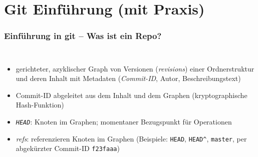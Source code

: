 \documentclass{beamer}
\begin{document}
\section{Git Einführung (mit Praxis)}
\begin{frame}
\frametitle{Einführung in git – Was ist ein Repo?}
\begin{columns}
  \begin{itemize}
  \item gerichteter, azyklischer Graph von Versionen
    (\emph{revisions}) einer Ordnerstruktur und deren Inhalt mit
    Metadaten (\emph{Commit-ID}, Autor, Beschreibungstext)
  \item Commit-ID abgeleitet aus dem Inhalt und dem Graphen
    (kryptographische Hash-Funktion)
  \item \emph{\texttt{HEAD}}: Knoten im Graphen; momentaner
    Bezugspunkt für Operationen
  \item \emph{refs}: referenzieren Knoten im Graphen (Beispiele:
    \texttt{HEAD}, \texttt{HEAD\^}, \texttt{master}, per abgekürzter
    Commit-ID \texttt{f23faaa})
  \end{itemize}
\end{columns}
\end{frame}
\end{document}
